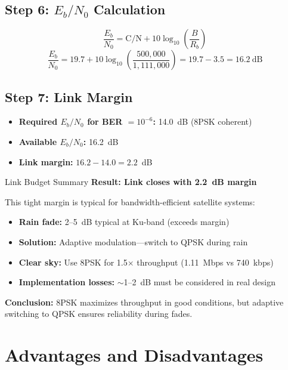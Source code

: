 \subsection*{Step 6: $E_b/N_0$ Calculation}

\begin{equation}
\frac{E_b}{N_0} = \mathrm{C/N} + 10\log_{10}\left(\frac{B}{R_b}\right)
\end{equation}
\begin{equation}
\frac{E_b}{N_0} = 19.7 + 10\log_{10}\left(\frac{500{,}000}{1{,}111{,}000}\right) = 19.7 - 3.5 = 16.2~\mathrm{dB}
\end{equation}

\subsection*{Step 7: Link Margin}

\begin{itemize}
\item \textbf{Required $E_b/N_0$ for BER $= 10^{-6}$:} 14.0~dB (8PSK coherent)
\item \textbf{Available $E_b/N_0$:} 16.2~dB
\item \textbf{Link margin:} $16.2 - 14.0 = 2.2$~dB
\end{itemize}

\begin{calloutbox}[colback=black!8!white,colframe=black]{Link Budget Summary}
\textbf{Result: Link closes with 2.2~dB margin}

This tight margin is typical for bandwidth-efficient satellite systems:
\begin{itemize}
\item \textbf{Rain fade:} 2--5~dB typical at Ku-band (exceeds margin)
\item \textbf{Solution:} Adaptive modulation---switch to QPSK during rain
\item \textbf{Clear sky:} Use 8PSK for 1.5$\times$ throughput (1.11~Mbps vs 740~kbps)
\item \textbf{Implementation losses:} $\sim$1--2~dB must be considered in real design
\end{itemize}

\textbf{Conclusion:} 8PSK maximizes throughput in good conditions, but adaptive switching to QPSK ensures reliability during fades.
\end{calloutbox}



\section{Advantages and Disadvantages}

